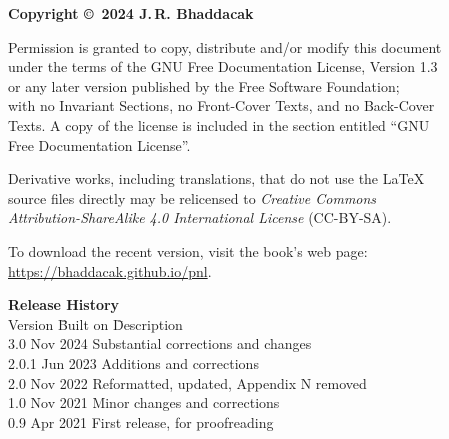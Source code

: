 \thispagestyle{empty}
{\footnotesize
\noindent\textbf{Copyright \copyright\ 2024 J.\,R. Bhaddacak}

\parskip=3mm
\noindent 
Permission is granted to copy, distribute and/or modify this document\\
under the terms of the GNU Free Documentation License, Version 1.3\\
or any later version published by the Free Software Foundation;\\
with no Invariant Sections, no Front-Cover Texts, and no Back-Cover\\
Texts.  A copy of the license is included in the section entitled ``GNU\\
Free Documentation License''.

\parskip=3mm
\noindent 
Derivative works, including translations, that do not use the \LaTeX\\
source files directly may be relicensed to \emph{Creative Commons\\
Attribution-ShareAlike 4.0 International License} (CC-BY-SA).

\parskip=3mm
\noindent 
To download the recent version, visit the book's web page:\\
\url{https://bhaddacak.github.io/pnl}.

\begin{tabbing}
\textbf{Release History}\\
Version \hspace{3mm} \= Built on \hspace{12mm} \= Description\\
3.0  Nov 2024 \> Substantial corrections and changes \\
2.0.1  Jun 2023 \> Additions and corrections \\
2.0  Nov 2022 \> Reformatted, updated, Appendix N removed \\
1.0  Nov 2021 \> Minor changes and corrections \\
0.9  Apr 2021 \> First release, for proofreading \\
\end{tabbing}
}
